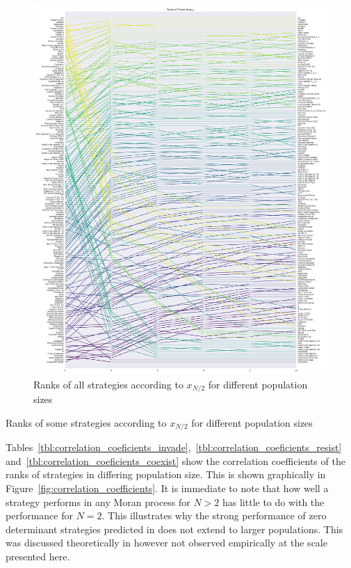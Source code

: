 \documentclass{article}
\begin{document}
\begin{figure}[!hbtp]
    \centering
    \includegraphics[height=.9\textheight]{./img/average_rank_vs_population_size_coexist.pdf}
    \caption{Ranks of all strategies according to \(x_{N/2}\) for different
    population sizes}
    \label{fig:ranks_v_size_coexist}
\end{figure}

\begin{table}[!hbtp]
    \centering
    \scriptsize
    
    \caption{Ranks of some strategies according to \(x_{N/2}\) for different
    population sizes}
    \label{tbl:ranks_v_size_coexist}
\end{table}

Tables~\ref{tbl:correlation_coeficients_invade},~\ref{tbl:correlation_coeficients_resist}
and~\ref{tbl:correlation_coeficients_coexist} show the correlation coefficients
of the ranks of strategies in differing population size. This is shown
graphically in Figure~\ref{fig:correlation_coefficients}. It is immediate to
note that how well a strategy performs in any Moran process for \(N>2\) has
little to do with the performance for \(N=2\). This illustrates why the strong
performance of zero determinant strategies predicted in \cite{Press2012} does
not extend to larger populations. This was discussed theoretically in
\cite{Adami2013} however not observed empirically at the scale presented here.
\end{document}
